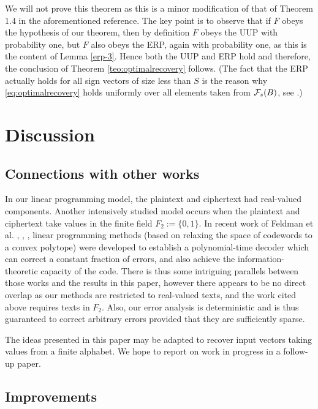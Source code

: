 \documentclass[11pt]{article}
\newcommand{\<}{\langle}
\renewcommand{\>}{\rangle}
\numberwithin{equation}{section}
\def\cF{{\cal F}}
\begin{document}
We will not prove this theorem as this is a minor modification of that
of Theorem 1.4 in the aforementioned reference. The key point is to
observe that if $F$ obeys the hypothesis of our theorem, then by
definition $F$ obeys the UUP with probability one, but $F$ also obeys
the ERP, again with probability one, as this is the content of Lemma
\ref{erp-3}.  Hence both the UUP and ERP hold and therefore, the
conclusion of Theorem \ref{teo:optimalrecovery} follows. (The fact that
the ERP actually holds for all sign vectors of size less than $S$
is the reason why \eqref{eq:optimalrecovery} holds uniformly over all
elements taken from $\cF_s(B)$, see \cite{OptimalRecovery}.)

\section{Discussion}
\label{sec:discussion}

\subsection{Connections with other works}

In our linear programming model, the plaintext and ciphertext had
real-valued components.  Another intensively studied model occurs when
the plaintext and ciphertext take values in the finite field $F_2 :=
\{0,1\}$.  In recent work of Feldman et al. \cite{feldman-thesis},
\cite{feldman-1}, \cite{feldman-2}, linear programming methods (based
on relaxing the space of codewords to a convex polytope) were
developed to establish a polynomial-time decoder which can correct a
constant fraction of errors, and also achieve the
information-theoretic capacity of the code.  There is thus some
intriguing parallels between those works and the results in this
paper, however there appears to be no direct overlap as our methods
are restricted to real-valued texts, and the work cited above requires
texts in $F_2$.  Also, our error analysis is deterministic and is thus
guaranteed to correct arbitrary errors provided that they are
sufficiently sparse.

The ideas presented in this paper may be adapted to recover input
vectors taking values from a finite alphabet. We hope to report on
work in progress in a follow-up paper.

\subsection{Improvements}
\end{document}
